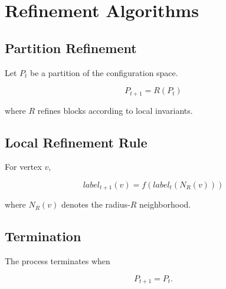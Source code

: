 \chapter{Refinement Algorithms}

\section{Partition Refinement}

Let \(P_t\) be a partition of the configuration space.

\[
P_{t+1} = R(P_t)
\]

where \(R\) refines blocks according to local invariants.

\section{Local Refinement Rule}

For vertex \(v\),

\[
label_{t+1}(v) = f(label_t(N_R(v)))
\]

where \(N_R(v)\) denotes the radius-\(R\) neighborhood.

\section{Termination}

The process terminates when

\[
P_{t+1} = P_t.
\]
